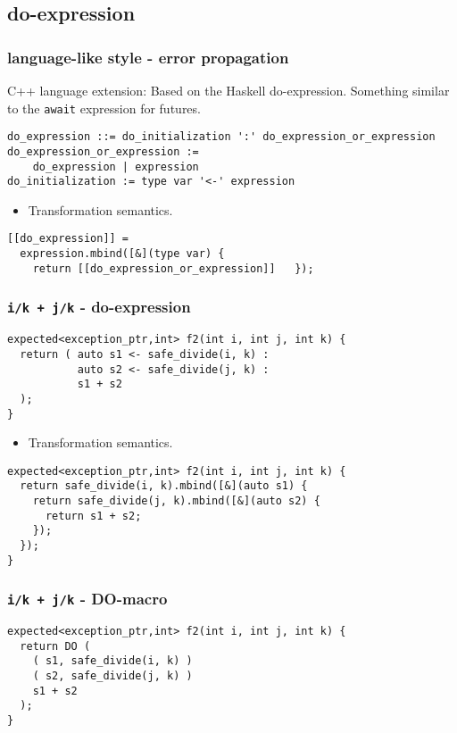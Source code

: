\documentclass[xcolor=dvipsnames]{beamer}
\newcommand{\cpp}[1]{\lstinline{#1}}
\begin{document}
\subsection{do-expression}
\begin{frame}[fragile]
\frametitle{language-like style  - error propagation}
C++ language extension: Based on the Haskell do-expression. Something similar to the \cpp{await} expression for futures.  

\begin{lstlisting}
do_expression ::= do_initialization ':' do_expression_or_expression
do_expression_or_expression := 
    do_expression | expression
do_initialization := type var '<-' expression
\end{lstlisting}

\begin{itemize}
  \item Transformation semantics.
\end{itemize}

\begin{lstlisting}
[[do_expression]] =
  expression.mbind([&](type var) {
    return [[do_expression_or_expression]]   });
\end{lstlisting}

\end{frame}
\begin{frame}[fragile]
\frametitle{\cpp{i/k + j/k}  - do-expression}

\begin{lstlisting}
expected<exception_ptr,int> f2(int i, int j, int k) {
  return ( auto s1 <- safe_divide(i, k) :
           auto s2 <- safe_divide(j, k) :
           s1 + s2  
  );
}
\end{lstlisting}
\begin{itemize}
  \item Transformation semantics.
\end{itemize}
\begin{lstlisting}
expected<exception_ptr,int> f2(int i, int j, int k) {
  return safe_divide(i, k).mbind([&](auto s1) {
    return safe_divide(j, k).mbind([&](auto s2) {
      return s1 + s2;
    });
  }); 
}
\end{lstlisting}
\end{frame}

\begin{frame}[fragile]
\frametitle{\cpp{i/k + j/k}  - DO-macro}

\begin{lstlisting}
expected<exception_ptr,int> f2(int i, int j, int k) {
  return DO (
    ( s1, safe_divide(i, k) )
    ( s2, safe_divide(j, k) )
    s1 + s2 
  );
}
\end{lstlisting}

\end{frame}
\end{document}
